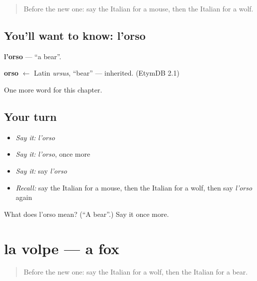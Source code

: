 \label{lesson:IT-C69-orso}



\begin{quote}
Before the new one: say the Italian for a mouse, then the Italian for a wolf.
\end{quote}

\subsection*{You'll want to know: l'orso}
\textbf{l'orso} — \textquotedblleft{}a bear\textquotedblright{}.

\begin{cousinweb}
\textbf{orso} $\leftarrow$ Latin \emph{ursus}, \textquotedblleft{}bear\textquotedblright{} — inherited. (EtymDB 2.1)
\end{cousinweb}

\begin{grammarlens}[title={What you've built}]
One more word for this chapter.
\end{grammarlens}

\subsection*{Your turn}
\begin{itemize}
\raggedright
  \item \emph{Say it:} \emph{l'orso}
  \item \emph{Say it:} \emph{l'orso}, once more
  \item \emph{Say it:} say \emph{l'orso}
  \item \emph{Recall:} say the Italian for a mouse, then the Italian for a wolf, then say \emph{l'orso} again
\end{itemize}

\begin{tcolorbox}[breakable,colback=teal!4,colframe=teal!35!black,title={Before you move on}]
What does l'orso mean? (\textquotedblleft{}A bear\textquotedblright{}.) Say it once more.
\end{tcolorbox}
\section[la volpe]{la volpe — a fox}

\label{lesson:IT-C69-volpe}



\begin{quote}
Before the new one: say the Italian for a wolf, then the Italian for a bear.
\end{quote}

